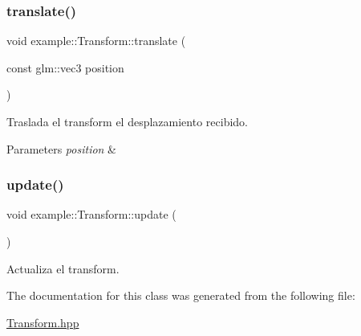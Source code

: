 \subsubsection{\texorpdfstring{translate()}{translate()}}
{\footnotesize\ttfamily void example\+::\+Transform\+::translate (\begin{DoxyParamCaption}\item[{const glm\+::vec3}]{position }\end{DoxyParamCaption})}



Traslada el transform el desplazamiento recibido. 


\begin{DoxyParams}{Parameters}
{\em position} & \\
\hline
\end{DoxyParams}
\mbox{\label{classexample_1_1_transform_ab41344f38e2a79e206a65ae7c4a67c68}} 
\subsubsection{\texorpdfstring{update()}{update()}}
{\footnotesize\ttfamily void example\+::\+Transform\+::update (\begin{DoxyParamCaption}{ }\end{DoxyParamCaption})\hspace{0.3cm}{\ttfamily [inline]}}



Actualiza el transform. 



The documentation for this class was generated from the following file\+:\begin{DoxyCompactItemize}
\item 
\mbox{\hyperlink{_transform_8hpp}{Transform.\+hpp}}\end{DoxyCompactItemize}
